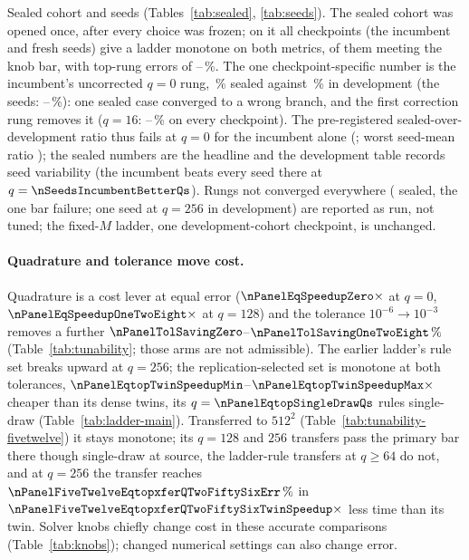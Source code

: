 Sealed cohort and seeds (Tables~\ref{tab:sealed}, \ref{tab:seeds}). The
sealed cohort was opened once, after every choice was frozen; on it all
\nSealedCheckpoints{} checkpoints (the incumbent and \nSeedsCount{} fresh
seeds) give a ladder monotone on both metrics, \nSealedKnobBarCount{} of
them meeting the knob bar, with top-rung errors of
\nSealedAllTopMin--\nSealedAllTopMax\,\%. The one
checkpoint-specific number is the incumbent's uncorrected $q=0$ rung,
\nSealedIncQzero\,\% sealed against \nPanelQzeroEvolved\,\% in
development (the seeds: \nSealedSeedsQzeroMin--\nSealedSeedsQzeroMax\,\%):
one sealed case converged to a wrong branch, and the first correction rung
removes it ($q=16$: \nSealedAllQsixteenMin--\nSealedAllQsixteenMax\,\% on
every checkpoint). The pre-registered sealed-over-development ratio thus
fails at $q=0$ for the incumbent alone (\nSealedCtwoIncQzeroRatio; worst
seed-mean ratio \nSealedCtwoWorstSeedRatio); the sealed numbers are the
headline and the development table records seed variability (the incumbent
beats every seed there at $q=\nSeedsIncumbentBetterQs$). Rungs not
converged everywhere (\nSealedUnconvergedCells{} sealed, the one bar
failure; one seed at $q=256$ in development) are reported as run, not tuned; the fixed-$M$
ladder, one development-cohort checkpoint, is unchanged.

\paragraph{Quadrature and tolerance move cost.}
Quadrature is a cost lever at equal error ($\nPanelEqSpeedupZero\times$
at $q=0$, $\nPanelEqSpeedupOneTwoEight\times$ at $q=128$) and the
tolerance $10^{-6}\to10^{-3}$ removes a further
$\nPanelTolSavingZero$--$\nPanelTolSavingOneTwoEight\,\%$
(Table~\ref{tab:tunability}; those arms are not admissible). The earlier ladder's rule set breaks
upward at $q=256$; the replication-selected set is monotone at both
tolerances,
$\nPanelEqtopTwinSpeedupMin$--$\nPanelEqtopTwinSpeedupMax\times$ cheaper
than its dense twins, its $q=\nPanelEqtopSingleDrawQs$ rules single-draw
(Table~\ref{tab:ladder-main}). Transferred to $512^2$ (Table~\ref{tab:tunability-fivetwelve}) it stays
monotone; its $q=128$ and $256$ transfers pass the primary bar there
though single-draw at source, the ladder-rule transfers at $q\ge64$ do not, and at $q=256$
the transfer reaches $\nPanelFiveTwelveEqtopxferQTwoFiftySixErr\,\%$ in
$\nPanelFiveTwelveEqtopxferQTwoFiftySixTwinSpeedup\times$ less time than
its twin. Solver knobs chiefly change cost in these accurate comparisons
(Table~\ref{tab:knobs}); changed numerical settings can also change error.

